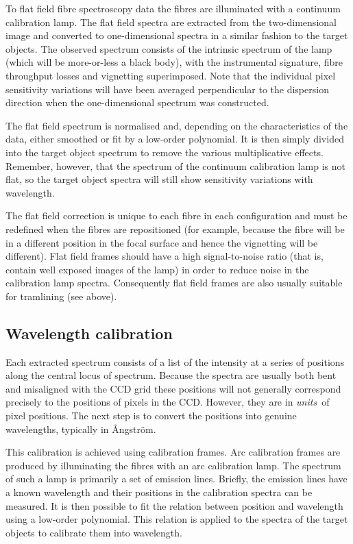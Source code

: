 \documentclass[chapters,twoside,11pt]{starlink}
\begin{document}
To flat field fibre spectroscopy data the fibres are illuminated with a
continuum calibration lamp.  The flat field spectra are extracted from
the two-dimensional image and converted to one-dimensional spectra in a
similar fashion to the target objects.  The observed spectrum consists
of the intrinsic spectrum of the lamp (which will be more-or-less a
black body), with the instrumental signature, fibre throughput losses
and vignetting superimposed.  Note that the individual pixel sensitivity
variations will have been averaged perpendicular to the dispersion
direction when the one-dimensional spectrum was constructed.

The flat field spectrum is normalised and, depending on the characteristics
of the data, either smoothed or fit by a low-order polynomial.  It is then
simply divided into the target object spectrum to remove the various
multiplicative effects.  Remember, however, that the spectrum of the
continuum calibration lamp is not flat, so the target object spectra will
still show sensitivity variations with wavelength.

The flat field correction is unique to each fibre in each configuration
and must be redefined when the fibres are repositioned (for example,
because the fibre will be in a different position in the focal surface
and hence the vignetting will be different).  Flat field frames should
have a high signal-to-noise ratio (that is, contain well exposed images
of the lamp) in order to reduce noise in the calibration lamp spectra.
Consequently flat field frames are also usually suitable for tramlining
(see above).

\subsection{\label{WAVEC}Wavelength calibration}

Each extracted spectrum consists of a list of the intensity at a series
of positions along the central locus of spectrum.  Because the spectra
are usually both bent and misaligned with the CCD grid these positions
will not generally correspond precisely to the positions of pixels in
the CCD.  However, they are in \textit{units}\, of pixel positions.  The
next step is to convert the positions into genuine wavelengths,
typically in \AA ngstr\"{o}m.

This calibration is achieved using calibration frames.  Arc calibration
frames are produced by illuminating the fibres with an arc calibration
lamp.  The spectrum of such a lamp is primarily a set of emission lines.
Briefly, the emission lines have a known wavelength and their positions
in the calibration spectra can be measured.  It is then possible to fit
the relation between position and wavelength using a low-order
polynomial.  This relation is applied to the spectra of the target
objects to calibrate them into wavelength.
\end{document}
